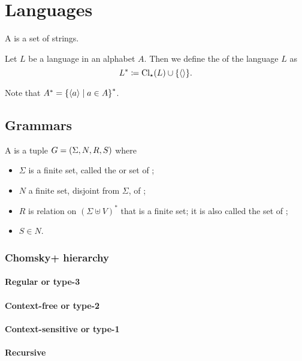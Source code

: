 \chapter{Languages}
\begin{definition}
A  is a set of strings.
\end{definition}

\begin{definition}
Let $L$ be a language in an alphabet $A$. Then we define the  of the language $L$ as
\[ L^* \coloneqq \operatorname{Cl}_\star(L) \cup \{\left\langle  \right\rangle\}. \]
\end{definition}
Note that $A^* = \setbuilder{\seq{a}}{a\in A}^*$.

\section{Grammars}
\begin{definition}
A  is a tuple $G = \sSet{\Sigma, N, R, S}$ where
\begin{itemize}
\item $\Sigma$ is a finite set, called the  or set of ;
\item $N$ a finite set, disjoint from $\Sigma$, of ;
\item $R$ is relation on $(\Sigma \uplus V)^*$ that is a finite set; it is also called the set of ;
\item $S\in N$.
\end{itemize}
\end{definition}

\subsection{Chomsky+ hierarchy}
\subsubsection{Regular or type-3}
\subsubsection{Context-free or type-2}
\subsubsection{Context-sensitive or type-1}
\subsubsection{Recursive}

